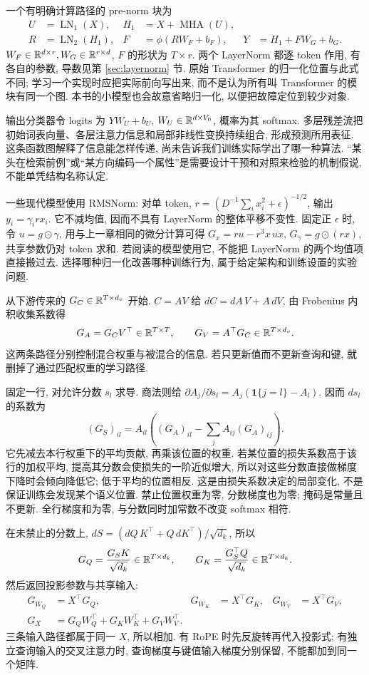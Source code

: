 一个有明确计算路径的 pre-norm 块为
\begin{align*}
U&=\operatorname{LN}_1(X),& H_1&=X+\operatorname{MHA}(U),\\
R&=\operatorname{LN}_2(H_1),&
F&=\phi(RW_F+b_F),&Y&=H_1+FW_G+b_G.
\end{align*}
$W_F\in\mathbb R^{d\times r},W_G\in\mathbb R^{r\times d}$, $F$ 的形状为 $T\times r$. 两个 LayerNorm 都逐 token 作用, 有各自的参数, 导数见第 \ref{sec:layernorm} 节. 原始 Transformer 的归一化位置与此式不同\cite{attention}; 学习一个实现时应把实际前向写出来, 而不是认为所有叫 Transformer 的模块有同一个图. 本书的小模型也会故意省略归一化, 以便把故障定位到较少对象.

输出分类器令 logits 为 $YW_U+b_U$, $W_U\in\mathbb R^{d\times V_0}$, 概率为其 softmax. 多层残差流把初始词表向量、各层注意力信息和局部非线性变换持续组合, 形成预测所用表征. 这条函数图解释了信息能怎样传递, 尚未告诉我们训练实际学出了哪一种算法. “某头在检索前例”或“某方向编码一个属性”是需要设计干预和对照来检验的机制假说, 不能单凭结构名称认定.

一些现代模型使用 RMSNorm: 对单 token, $r=(D^{-1}\sum_i x_i^2+\epsilon)^{-1/2}$, 输出 $y_i=\gamma_i r x_i$. 它不减均值, 因而不具有 LayerNorm 的整体平移不变性. 固定正 $\epsilon$ 时, 令 $u=g\odot\gamma$, 用与上一章相同的微分计算可得
$G_x=ru-r^3x\,\overline{ux}$, $G_\gamma=g\odot(rx)$, 共享参数仍对 token 求和. 若阅读的模型使用它, 不能把 LayerNorm 的两个均值项直接搬过去. 选择哪种归一化改善哪种训练行为, 属于给定架构和训练设置的实验问题.

从下游传来的 $G_C\in\mathbb R^{T\times d_v}$ 开始. $C=AV$ 给 $dC=dA\,V+A\,dV$, 由 Frobenius 内积收集系数得
\[
G_A=G_CV^\top\in\mathbb R^{T\times T},\qquad
G_V=A^\top G_C\in\mathbb R^{T\times d_v}.
\]
这两条路径分别控制混合权重与被混合的信息. 若只更新值而不更新查询和键, 就删掉了通过匹配权重的学习路径.

固定一行, 对允许分数 $s_l$ 求导. 商法则给
$\partial A_j/\partial s_l=A_j(\mathbf1\{j=l\}-A_l)$. 因而 $ds_l$ 的系数为
\[
(G_S)_{il}=A_{il}\left((G_A)_{il}-\sum_j A_{ij}(G_A)_{ij}\right).
\]
它先减去本行权重下的平均贡献, 再乘该位置的权重. 若某位置的损失系数高于该行的加权平均, 提高其分数会使损失的一阶近似增大, 所以对这些分数直接做梯度下降时会倾向降低它; 低于平均的位置相反. 这是由损失系数决定的局部变化, 不是保证训练会发现某个语义位置. 禁止位置权重为零, 分数梯度也为零; 掩码是常量且不更新. 全行梯度和为零, 与分数同时加常数不改变 softmax 相符.

在未禁止的分数上, $dS=(dQ\,K^\top+Q\,dK^\top)/\sqrt{d_k}$, 所以
\[
G_Q=\frac{G_SK}{\sqrt{d_k}}\in\mathbb R^{T\times d_k},\qquad
G_K=\frac{G_S^\top Q}{\sqrt{d_k}}\in\mathbb R^{T\times d_k}.
\]
然后返回投影参数与共享输入:
\begin{align*}
G_{W_Q}&=X^\top G_Q,&G_{W_K}&=X^\top G_K,&G_{W_V}&=X^\top G_V,\\
G_X&=G_QW_Q^\top+G_KW_K^\top+G_VW_V^\top.
\end{align*}
三条输入路径都属于同一 $X$, 所以相加. 有 RoPE 时先反旋转再代入投影式; 有独立查询输入的交叉注意力时, 查询梯度与键值输入梯度分别保留, 不能都加到同一个矩阵.

